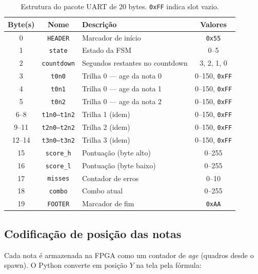 \documentclass[12pt,a4paper]{article}
\begin{document}
\begin{table}[H]
\centering
\begin{tabular}{cclc}
\toprule
\textbf{Byte(s)} & \textbf{Nome} & \textbf{Descrição} & \textbf{Valores} \\
\midrule
0  & \texttt{HEADER}     & Marcador de início                   & \texttt{0x55} \\
1  & \texttt{state}      & Estado da FSM                        & 0--5 \\
2  & \texttt{countdown}  & Segundos restantes no countdown      & 3, 2, 1, 0 \\
3  & \texttt{t0n0}       & Trilha 0 — age da nota 0             & 0--150, \texttt{0xFF} \\
4  & \texttt{t0n1}       & Trilha 0 — age da nota 1             & 0--150, \texttt{0xFF} \\
5  & \texttt{t0n2}       & Trilha 0 — age da nota 2             & 0--150, \texttt{0xFF} \\
6--8  & \texttt{t1n0--t1n2} & Trilha 1 (idem)                   & 0--150, \texttt{0xFF} \\
9--11 & \texttt{t2n0--t2n2} & Trilha 2 (idem)                   & 0--150, \texttt{0xFF} \\
12--14& \texttt{t3n0--t3n2} & Trilha 3 (idem)                   & 0--150, \texttt{0xFF} \\
15 & \texttt{score\_h}   & Pontuação (byte alto)                & 0--255 \\
16 & \texttt{score\_l}   & Pontuação (byte baixo)               & 0--255 \\
17 & \texttt{misses}     & Contador de erros                    & 0--10 \\
18 & \texttt{combo}      & Combo atual                          & 0--255 \\
19 & \texttt{FOOTER}     & Marcador de fim                      & \texttt{0xAA} \\
\bottomrule
\end{tabular}
\caption{Estrutura do pacote UART de 20 bytes. \texttt{0xFF} indica slot vazio.}
\end{table}

\subsection{Codificação de posição das notas}

Cada nota é armazenada na FPGA como um contador de \emph{age} (quadros desde o spawn). O Python converte em posição $Y$ na tela pela fórmula:
\end{document}
